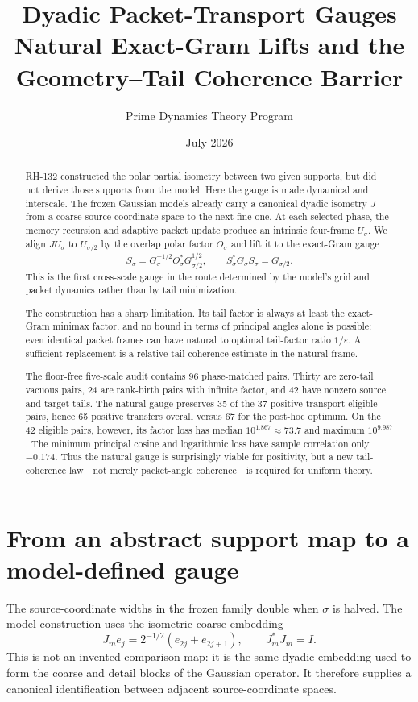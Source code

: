 \documentclass[12pt]{article}
\title{Dyadic Packet-Transport Gauges\\\large Natural Exact-Gram Lifts and the Geometry--Tail Coherence Barrier}
\author{Prime Dynamics Theory Program}
\date{July 2026}
\begin{document}
\maketitle

\begin{abstract}
RH-132 constructed the polar partial isometry between two given supports,
but did not derive those supports from the model.  Here the gauge is made
dynamical and interscale.  The frozen Gaussian models already carry a
canonical dyadic isometry $J$ from a coarse source-coordinate space to the
next fine one.  At each selected phase, the memory recursion and adaptive
packet update produce an intrinsic four-frame $U_\sigma$.  We align
$JU_\sigma$ to $U_{\sigma/2}$ by the overlap polar factor $O_\sigma$ and
lift it to the exact-Gram gauge
\[
 S_\sigma=G_\sigma^{-1/2}O_\sigma^*G_{\sigma/2}^{1/2},
 \qquad
 S_\sigma^*G_\sigma S_\sigma=G_{\sigma/2}.
\]
This is the first cross-scale gauge in the route determined by the model's
grid and packet dynamics rather than by tail minimization.

The construction has a sharp limitation.  Its tail factor is always at
least the exact-Gram minimax factor, and no bound in terms of principal
angles alone is possible: even identical packet frames can have natural to
optimal tail-factor ratio $1/\varepsilon$.  A sufficient replacement is a
relative-tail coherence estimate in the natural frame.

The floor-free five-scale audit contains 96 phase-matched pairs.  Thirty are
zero-tail vacuous pairs, 24 are rank-birth pairs with infinite factor, and 42
have nonzero source and target tails.  The natural gauge preserves 35 of the
37 positive transport-eligible pairs, hence 65 positive transfers overall
versus 67 for the post-hoc optimum.  On the 42 eligible pairs, however, its
factor loss has median $10^{1.867}\approx73.7$ and maximum
$10^{9.987}$.  The minimum principal cosine and logarithmic loss have sample
correlation only $-0.174$.  Thus the natural gauge is surprisingly viable
for positivity, but a new tail-coherence law---not merely packet-angle
coherence---is required for uniform theory.
\end{abstract}

\section{From an abstract support map to a model-defined gauge}
The source-coordinate widths in the frozen family double when
$\sigma$ is halved.  The model construction uses the isometric coarse
embedding
\[
 J_m e_j=2^{-1/2}(e_{2j}+e_{2j+1}),
 \qquad J_m^*J_m=I.
\]
This is not an invented comparison map: it is the same dyadic embedding used
to form the coarse and detail blocks of the Gaussian operator.  It therefore
supplies a canonical identification between adjacent source-coordinate
spaces.
\end{document}
